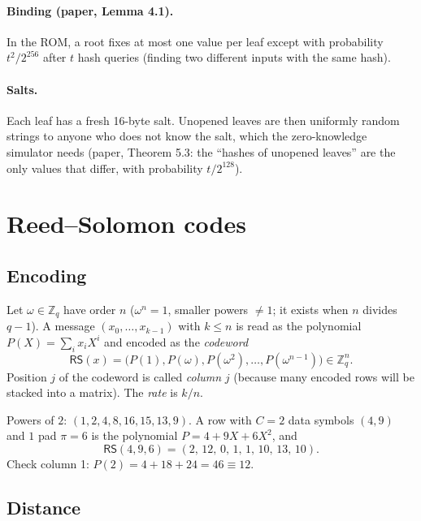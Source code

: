 \documentclass[11pt,a4paper]{article}
\newcommand{\Zq}{\mathbb{Z}_q}
\newcommand{\RS}{\mathsf{RS}}
\theoremstyle{definition}
\theoremstyle{plain}
\begin{document}
\paragraph{Binding (paper, Lemma 4.1).} In the ROM, a root fixes at most one value per leaf except
with probability $t^2/2^{256}$ after $t$ hash queries (finding two different inputs with the same
hash).

\paragraph{Salts.} Each leaf has a fresh 16-byte salt. Unopened leaves are then uniformly random
strings to anyone who does not know the salt, which the zero-knowledge simulator needs
(paper, Theorem 5.3: the ``hashes of unopened leaves'' are the only values that differ, with
probability $t/2^{128}$).

\section{Reed--Solomon codes}
\label{sec:rs}

\subsection{Encoding}

Let $\omega\in\Zq$ have order $n$ ($\omega^n=1$, smaller powers $\neq 1$; it exists when $n$ divides
$q-1$). A message $(x_0,\dots,x_{k-1})$ with $k\le n$ is read as the polynomial
$P(X)=\sum_i x_iX^i$ and encoded as the \emph{codeword}
\[
  \RS(x)=\bigl(P(1),P(\omega),P(\omega^2),\dots,P(\omega^{n-1})\bigr)\in\Zq^n .
\]
Position $j$ of the codeword is called \emph{column} $j$ (because many encoded rows will be stacked
into a matrix). The \emph{rate} is $k/n$.

\begin{example}[$q=17$, $n=8$, $\omega=2$, $k=3$]
Powers of $2$: $(1,2,4,8,16,15,13,9)$. A row with $C=2$ data symbols $(4,9)$ and $1$ pad $\pi=6$ is the
polynomial $P=4+9X+6X^2$, and
\[
  \RS(4,9,6)=(2,\,12,\,0,\,1,\,1,\,10,\,13,\,10).
\]
Check column 1: $P(2)=4+18+24=46\equiv 12$.
\end{example}

\subsection{Distance}
\end{document}
